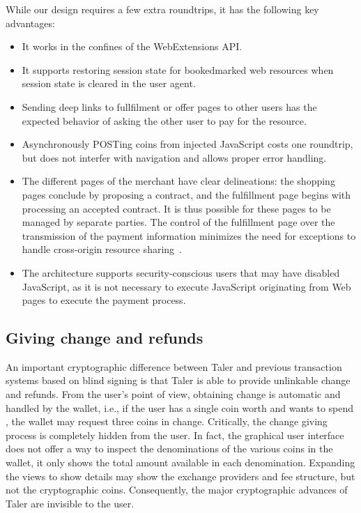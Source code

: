 \documentclass{llncs}
\begin{document}
\noindent
While our design requires a few extra roundtrips,
it has the following key advantages:
\begin{itemize}
  \item It works in the confines of the WebExtensions API.
  \item It supports restoring session state for bookedmarked
    web resources when session state is cleared in the user agent.
  \item Sending deep links to fullfilment or offer pages to
    other users has the expected behavior
    of asking the other user to pay for the resource.
  \item Asynchronously POSTing coins from injected JavaScript costs
    one roundtrip, but does not interfer with navigation and allows
    proper error handling.
  \item The different pages of the merchant have clear
    delineations: the shopping pages conclude by proposing a contract, and
    the fulfillment page begins with processing an accepted contract.  It is thus
    possible for these pages to be managed by separate parties. The
    control of the fulfillment page over the transmission of the payment
    information minimizes the need for exceptions to handle cross-origin
    resource sharing~\cite{rfc6454,cors}.
  \item The architecture supports security-conscious users that may have
    disabled JavaScript, as it is not necessary to execute JavaScript
    originating from Web pages to execute the payment process.
\end{itemize}


\subsection{Giving change and refunds}

An important cryptographic difference between Taler and previous
transaction systems based on blind signing is that Taler is able to
provide unlinkable change and refunds.  From the user's point of view,
obtaining change is automatic and handled by the wallet, i.e., if the
user has a single coin worth  and wants to spend , the
wallet may request three  coins in change. Critically, the
change giving process is completely hidden from the user.
In fact, the graphical user
interface does not offer a way to inspect the denominations of the
various coins in the wallet, it only shows the total amount available
in each denomination.  Expanding the views to show details may show
the exchange providers and fee structure, but not the cryptographic
coins.  Consequently, the major cryptographic advances of Taler are
invisible to the user.
\end{document}
